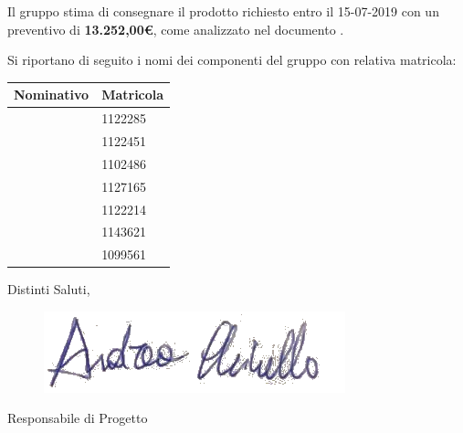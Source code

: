 \noindent Il gruppo \groupName{} stima di consegnare il prodotto richiesto entro il 15-07-2019 con un preventivo di \textbf{13.252,00\euro}, come analizzato nel documento \docNameVersionPdP.

\vspace{10pt}

\noindent Si riportano di seguito i nomi dei componenti del gruppo con relativa matricola:


\begin{center}
    \renewcommand{\arraystretch}{2.2}
    
    \begin{longtable}{ m{5cm} m{3cm} }
        
        \rowcolor[HTML]{232f3e}
    
        \rowcolors{3}{tableRow}{}
        \color[HTML]{FFFFFF} \textbf{Nominativo} & \color[HTML]{FFFFFF} \textbf{Matricola} \\
    \endhead
	  \davide{} & 1122285 \\ 
    \giacomo{} & 1122451 \\
    \singh{} & 1102486 \\ 
    \daniele{} & 1127165 \\ 
    \francesco{} & 1122214 \\
    \andrea{} & 1143621 \\
    \valentin{} & 1099561 \\

    \end{longtable}
    
\end{center}


Distinti Saluti,

\begin{figure}[htbp]
\includegraphics[scale=0.7]{./immagini/andrea_firma.png}
\end{figure}

\andrea{}

Responsabile di Progetto